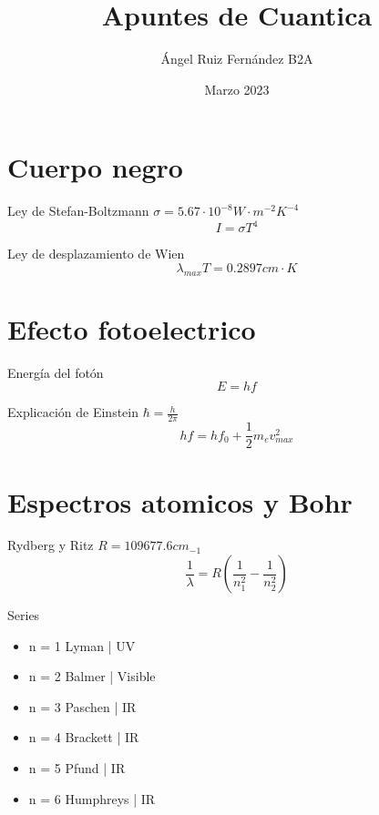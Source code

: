 \documentclass[12pt, letterpaper, twoside]{article}
\title{Apuntes de Cuantica}
\author{Ángel Ruiz Fernández B2A}
\date{Marzo 2023}
\begin{document}
	\maketitle
	
	\section{Cuerpo negro}
	
	Ley de Stefan-Boltzmann $\sigma = 5.67 \cdot 10^{-8} W \cdot m^{-2} K^{-4} $
	\begin{equation}
		I = \sigma T^4
	\end{equation}
	
	Ley de desplazamiento de Wien
	\begin{equation}
		\lambda_{max} T = 0.2897 cm \cdot K
	\end{equation}

	\section{Efecto fotoelectrico}
	
	Energía del fotón
	\begin{equation}
		E = hf
	\end{equation}

	Explicación de Einstein $\hbar = \frac{h}{2 \pi}$
	\begin{equation}
		hf = hf_0 + \frac{1}{2} m_e v^2_{max}
	\end{equation}

	\section{Espectros atomicos y Bohr}
	Rydberg y Ritz $R = 109677.6 cm_{-1}$
	\begin{equation}
		\frac{1}{\lambda} = R ( \frac{1}{n_{1}^2} - \frac{1}{n^{2}_2})
	\end{equation}

	Series
	\begin{itemize}
		\item n = 1 Lyman | UV
		\item n = 2 Balmer | Visible
		\item n = 3 Paschen | IR
		\item n = 4 Brackett | IR
		\item n = 5 Pfund | IR
		\item n = 6 Humphreys | IR
	\end{itemize}
	\pagebreak
\end{document}
